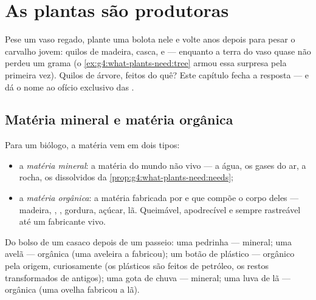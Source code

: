 \chapter{As plantas são produtoras}\label{ch:g6:plants-are-producers}

Pese um vaso regado, plante uma bolota nele e volte anos depois para
pesar o carvalho jovem: quilos de madeira, casca,  e  ---
enquanto a terra do vaso quase não perdeu um grama (o
\cref{ex:g4:what-plants-need:tree} armou essa surpresa pela primeira
vez). Quilos de árvore, feitos do quê? Este capítulo fecha a resposta
--- e dá o nome ao ofício exclusivo das .

\section{Matéria mineral e matéria orgânica}

\begin{definition}\label{def:g6:plants-are-producers:matter}
Para um biólogo, a matéria vem em dois tipos:
\begin{itemize}
  \item a \emph{matéria mineral}: a matéria
        do mundo não vivo --- a água, os gases do ar, a rocha, os
         dissolvidos da
        \cref{prop:g4:what-plants-need:needs};
  \item a \emph{matéria orgânica}: a matéria
        fabricada por  e que compõe o corpo deles ---
        madeira, , , gordura, açúcar, lã. Queimável,
        apodrecível e sempre rastreável até um fabricante vivo.
\end{itemize}
\end{definition}

\begin{example}\label{ex:g6:plants-are-producers:sorting}
Do bolso de um casaco depois de um passeio: uma pedrinha ---
mineral; uma avelã --- orgânica (uma aveleira a fabricou); um botão
de plástico --- orgânico pela origem, curiosamente (os plásticos são
feitos de petróleo, os restos transformados de  antigos);
uma gota de chuva --- mineral; uma luva de lã --- orgânica (uma
ovelha fabricou a lã).
\end{example}

